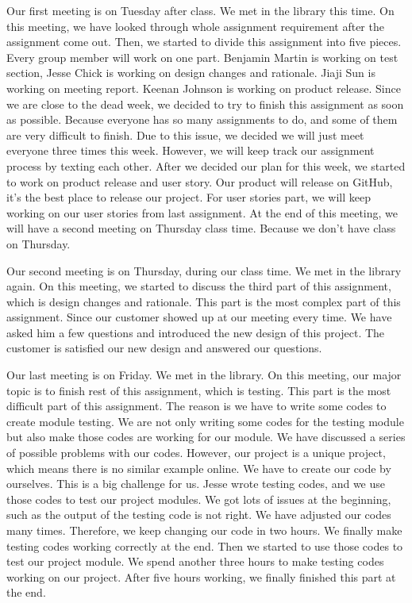 \documentclass[12pt]{article}
\begin{document}
\begin{enumerate}
\par Our first meeting is on Tuesday after class. We met in the library this time. On this meeting, we have looked through whole assignment requirement after the assignment come out. Then, we started to divide this assignment into five pieces. Every group member will work on one part. Benjamin Martin is working on test section, Jesse Chick is working on design changes and rationale. Jiaji Sun is working on meeting report. Keenan Johnson is working on product release. Since we are close to the dead week, we decided to try to finish this assignment as soon as possible. Because everyone has so many assignments to do, and some of them are very difficult to finish. Due to this issue, we decided we will just meet everyone three times this week. However, we will keep track our assignment process by texting each other. After we decided our plan for this week, we started to work on product release and user story. Our product will release on GitHub, it’s the best place to release our project. For user stories part, we will keep working on our user stories from last assignment. At the end of this meeting, we will have a second meeting on Thursday class time. Because we don’t have class on Thursday. \\

\par Our second meeting is on Thursday, during our class time. We met in the library again. On this meeting, we started to discuss the third part of this assignment, which is design changes and rationale. This part is the most complex part of this assignment. Since our customer showed up at our meeting every time. We have asked him a few questions and introduced the new design of this project. The customer is satisfied our new design and answered our questions. \\

\par Our last meeting is on Friday. We met in the library. On this meeting, our major topic is to finish rest of this assignment, which is testing. This part is the most difficult part of this assignment. The reason is we have to write some codes to create module testing. We are not only writing some codes for the testing module but also make those codes are working for our module. We have discussed a series of possible problems with our codes. However, our project is a unique project, which means there is no similar example online. We have to create our code by ourselves. This is a big challenge for us. Jesse wrote testing codes, and we use those codes to test our project modules. We got lots of issues at the beginning, such as the output of the testing code is not right. We have adjusted our codes many times. Therefore, we keep changing our code in two hours. We finally make testing codes working correctly at the end. Then we started to use those codes to test our project module. We spend another three hours to make testing codes working on our project. After five hours working, we finally finished this part at the end. \\


\end{enumerate}
\end{document}
